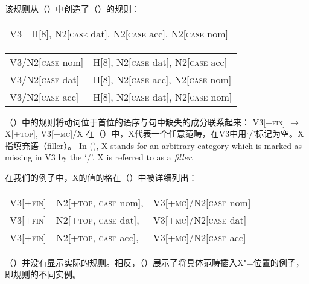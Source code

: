 \noindent
该规则从（）中创造了（）的规则：
\ea
\begin{tabular}[t]{@{}l@{~$\to$~}l@{}}
V3  & H[8], N2[\textsc{case} dat], N2[\textsc{case} acc], N2[\textsc{case} nom] 
\end{tabular}
\z
\ea
\begin{tabular}[t]{@{}l@{~$\to$~}l@{}}
V3/N2[\textsc{case} nom] &  H[8], N2[\textsc{case} dat], N2[\textsc{case} acc]\\
V3/N2[\textsc{case} dat] &  H[8], N2[\textsc{case} acc], N2[\textsc{case} nom]\\
V3/N2[\textsc{case} acc] &  H[8], N2[\textsc{case} dat], N2[\textsc{case} nom]\\
\end{tabular}
\z

\noindent
（）中的规则将动词位于首位的语序与句中缺失的成分联系起来：
\ea
\label{gpsg-vs-regel}
V3[+\textsc{fin}] $\to$ X[+\textsc{top}], V3[+\textsc{mc}]/X
\z
在（）中，X代表一个任意范畴，在V3中用`/'标记为空。X指填充语（filler）。
In (), X stands for an arbitrary category which is marked as missing in V3 by the `/'. X is referred to as a 
\emph{filler}.

在我们的例子中，X的值的格在（）中被详细列出：
\ea
\begin{tabular}[t]{@{}l@{~$\to$~}l@{~}l@{}}
V3[+\textsc{fin}] & N2[+\textsc{top}, \textsc{case} nom], & V3[+\textsc{mc}]/N2[\textsc{case} nom]\\
V3[+\textsc{fin}] & N2[+\textsc{top}, \textsc{case} dat], & V3[+\textsc{mc}]/N2[\textsc{case} dat]\\
V3[+\textsc{fin}] & N2[+\textsc{top}, \textsc{case} acc], & V3[+\textsc{mc}]/N2[\textsc{case} acc]\\
\end{tabular}
\z
（）并没有显示实际的规则。相反，（）展示了将具体范畴插入X"=位置的例子，即规则的不同实例。

